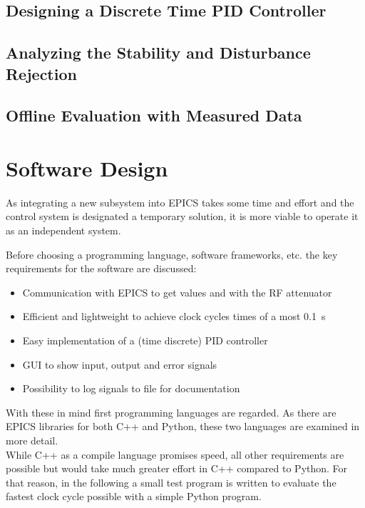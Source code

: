 \subsection{Designing a Discrete Time PID Controller}
\subsection{Analyzing the Stability and Disturbance Rejection}
\subsection{Offline Evaluation with Measured Data}






















\newpage
\section{Software Design}
As integrating a new subsystem into EPICS takes some time and effort and the control system is designated a temporary solution, it is more viable to operate it as an independent system.

Before choosing a programming language, software frameworks, etc. the key requirements for the software are discussed:
\begin{itemize}
\item Communication with EPICS to get values and with the RF attenuator
\item Efficient and lightweight to achieve clock cycles times of a most \SI{0.1}{\second}
\item Easy implementation of a (time discrete) PID controller
\item GUI to show input, output and error signals
\item Possibility to log signals to file for documentation
\end{itemize}

With these in mind first programming languages are regarded. As there are EPICS libraries for both C++ and Python, these two languages are examined in more detail.\\
While C++ as a compile language promises speed, all other requirements are possible but would take much greater effort in C++ compared to Python. For that reason, in the following a small test program is written to evaluate the fastest clock cycle possible with a simple Python program.

